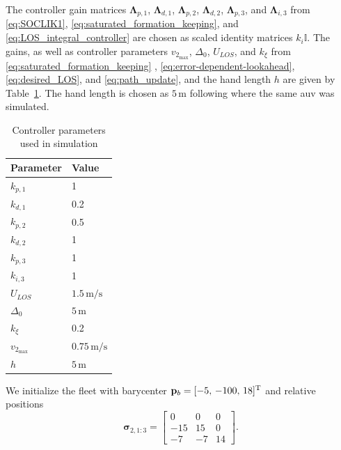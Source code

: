 The controller gain matrices $\bm{\Lambda}_{p,1}$, $\bm{\Lambda}_{d,1}$, $\bm{\Lambda}_{p,2}$, $\bm{\Lambda}_{d,2}$, $\bm{\Lambda}_{p,3}$, and $\bm{\Lambda}_{i,3}$ from \eqref{eq:SOCLIK1}, \eqref{eq:saturated_formation_keeping}, and \eqref{eq:LOS_integral_controller} are chosen as scaled identity matrices $k_i \mathbb{I}$. The gains, as well as controller parameters $v_{2_{\max}}$, $\Delta_0$, $U_{LOS}$, and $k_\xi$ from \eqref{eq:saturated_formation_keeping} ,  \eqref{eq:error-dependent-lookahead}, \eqref{eq:desired_LOS}, and \eqref{eq:path_update}, and the hand length $h$ are given by Table~\ref{tab:simulation_parameters1}. The hand length is chosen as $5\, \mathrm{m}$ following \cite{matous_trajectory_2023} where the same \gls{auv} was simulated.

\begin{table}[ht]
  \centering
  \caption{Controller parameters used in simulation}
  \label{tab:simulation_parameters1}
  \begin{tabular}{ll}
    \hline
    Parameter & Value \\
    \hline
    $k_{p,1}$ & 1 \\
    $k_{d,1}$ & 0.2 \\
    $k_{p,2}$ & 0.5 \\
    $k_{d,2}$ & 1 \\
    $k_{p,3}$ & 1 \\
    $k_{i,3}$ & 1 \\
    $U_{LOS}$ & $1.5\, \mathrm{m/s}$ \\
    $\Delta_0$ & $5\, \mathrm{m}$ \\
    $k_\xi$ & 0.2 \\
    $v_{2_{\max}}$ & $0.75\, \mathrm{m/s}$ \\
    $h$ & $5 \, \mathrm{m}$\\
    \hline
  \end{tabular}
\end{table}

We initialize the fleet with barycenter $\mathbf{p}_b = [-5,\, -100,\, 18]^{\rm T}$ and relative positions 
\begin{equation}
    \bm{\sigma}_{2,1:3} = \begin{bmatrix}0 & 0 & 0\\ -15 & 15 & 0 \\ -7 & -7 & 14\end{bmatrix}.%
\end{equation}

